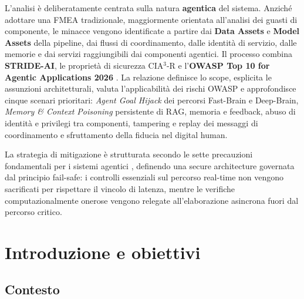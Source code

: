 \documentclass[11pt,a4paper]{article}
\begin{document}
L'analisi è deliberatamente centrata sulla natura \textbf{agentica} del
sistema. Anziché adottare una FMEA tradizionale, maggiormente orientata
all'analisi dei guasti di componente, le minacce vengono identificate a
partire dai \textbf{Data Assets} e \textbf{Model Assets} della pipeline,
dai flussi di coordinamento, dalle identità di servizio, dalle memorie e
dai servizi raggiungibili dai componenti agentici. Il processo combina
\textbf{STRIDE-AI}, le proprietà di sicurezza CIA$^3$-R e
l'\textbf{OWASP Top 10 for Agentic Applications 2026}
\cite{owaspagentic}. La relazione definisce lo scope, esplicita le
assunzioni architetturali, valuta l'applicabilità dei rischi OWASP e
approfondisce cinque scenari prioritari: \emph{Agent Goal Hijack} dei
percorsi Fast-Brain e Deep-Brain, \emph{Memory \& Context Poisoning}
persistente di RAG, memoria e feedback, abuso di identità e privilegi
tra componenti, tampering e replay dei messaggi di coordinamento e
sfruttamento della fiducia nel digital human.


La strategia di mitigazione è strutturata secondo le sette precauzioni
fondamentali per i sistemi agentici \cite{damianiagentic}, definendo una
secure architecture governata dal principio fail-safe: i controlli
essenziali sul percorso real-time non vengono sacrificati per rispettare
il vincolo di latenza, mentre le verifiche computazionalmente onerose
vengono relegate all'elaborazione asincrona fuori dal percorso critico.

\section{Introduzione e obiettivi}

\subsection{Contesto}
\label{subsec:contesto}
\end{document}
